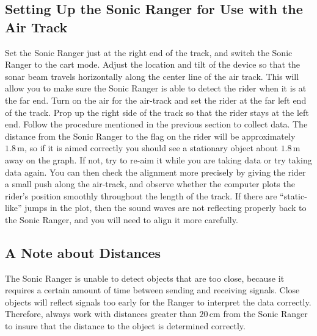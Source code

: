 \subsection{Setting Up the Sonic Ranger for Use with the Air Track}

Set the Sonic Ranger just at the right end of the track, and switch the Sonic Ranger to the cart mode.  Adjust the location and tilt of the device so that the sonar beam travels horizontally along the center line of the air track.  This will allow you to make sure the Sonic Ranger is able to detect the rider when it is at the far end.  Turn on the air for the air-track and set the rider at the far left end of the track.   Prop up the right side of the track so that the rider stays at the left end. Follow the procedure mentioned in the previous section to collect data.  The distance from the Sonic Ranger to the flag on the rider will be approximately $1.8\,\mathrm{m}$, so if it is aimed correctly you should see a stationary object about $1.8\,\mathrm{m}$ away on the graph. If not, try to re-aim it while you are taking data or try taking data again.  You can then check the alignment more precisely by giving the rider a small push along the air-track, and observe whether the computer plots the rider's position smoothly throughout the length of the track.  If there are ``static-like'' jumps in the plot, then the sound waves are not reflecting properly back to the Sonic Ranger, and you will need to align it more carefully.

\subsection{A Note about Distances}

The Sonic Ranger is unable to detect objects that are too close, because it requires a certain amount of time between sending and receiving signals.  Close objects will reflect signals too early for the Ranger to interpret the data correctly.  Therefore, always work with distances greater than $20\,\mathrm{cm}$ from the Sonic Ranger to insure that the distance to the object is determined correctly. \myskip

